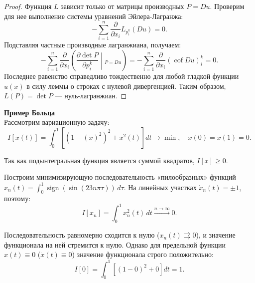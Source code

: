 \begin{proof}
    Функция $L$ зависит только от матрицы производных $P = Du$. Проверим для нее выполнение системы уравнений Эйлера-Лагранжа:
    \begin{equation}
        - \sum_{i=1}^n \frac{\partial}{\partial x_i} L_{p_i^k}(Du) = 0.
    \end{equation}
    Подставляя частные производные лагранжиана, получаем:
    \begin{equation}
        - \sum_{i=1}^n \frac{\partial}{\partial x_i} \left( \frac{\partial \det P}{\partial p_i^k} \middle|_{P = Du} \right) = - \sum_{i=1}^n \frac{\partial}{\partial x_i} (\operatorname{cof} Du)_i^k = 0.
    \end{equation}
    Последнее равенство справедливо тождественно для любой гладкой функции $u(x)$ в силу леммы о строках с нулевой дивергенцией. Таким образом, $L(P) = \det P$ --- нуль-лагранжиан.
\end{proof}

\textbf{Пример Больца}\\
Рассмотрим вариационную задачу:
\begin{equation}
    I[x(t)] = \int_0^1 \left[ \left(1 - \left(\dot{x}\right)^2\right)^2 + x^2(t) \right] dt \rightarrow \min, \quad x(0) = x(1) = 0.
\end{equation}

Так как подынтегральная функция является суммой квадратов, $I[x] \ge 0$. 

Построим минимизирующую последовательность «пилообразных» функций 
$x_n(t) = \int_0^1 \operatorname{sign}(\sin(23n\pi \tau)) \, d\tau$. 
На линейных участках $\dot{x}_n(t) = \pm 1$, поэтому:
\begin{equation}
    I[x_n] = \int_0^1 x_n^2(t) \, dt \xrightarrow{n \to \infty} 0.
\end{equation}

Последовательность равномерно сходится к нулю ($x_n(t) \rightrightarrows 0$), 
и значение функционала на ней стремится к нулю. 
Однако для предельной функции $x(t) \equiv 0$ ($\dot{x}(t) \equiv 0$) 
значение функционала строго положительно:
\begin{equation}
    I[0] = \int_0^1 \left[ (1 - 0)^2 + 0 \right] dt = 1.
\end{equation}

